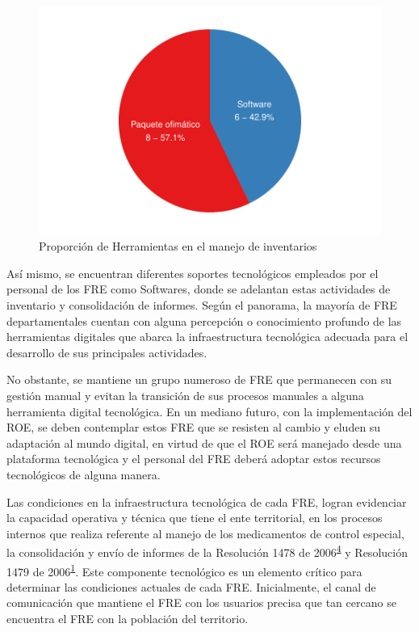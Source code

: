 \documentclass[
]{book}
\begin{document}
\begin{figure}
\includegraphics[width=0.85\linewidth]{InformeFinal_files/figure-latex/PropHerramientasManejoInventarios-1} \caption{Proporción de Herramientas en el manejo de inventarios}\label{fig:PropHerramientasManejoInventarios}
\end{figure}

Así mismo, se encuentran diferentes soportes tecnológicos empleados por el personal de los FRE como Softwares, donde se adelantan estas actividades de inventario y consolidación de informes. Según el panorama, la mayoría de FRE departamentales cuentan con alguna percepción o conocimiento profundo de las herramientas digitales que abarca la infraestructura tecnológica adecuada para el desarrollo de sus principales actividades.

No obstante, se mantiene un grupo numeroso de FRE que permanecen con su gestión manual y evitan la transición de sus procesos manuales a alguna herramienta digital tecnológica. En un mediano futuro, con la implementación del ROE, se deben contemplar estos FRE que se resisten al cambio y eluden su adaptación al mundo digital, en virtud de que el ROE será manejado desde una plataforma tecnológica y el personal del FRE deberá adoptar estos recursos tecnológicos de alguna manera.

Las condiciones en la infraestructura tecnológica de cada FRE, logran evidenciar la capacidad operativa y técnica que tiene el ente territorial, en los procesos internos que realiza referente al manejo de los medicamentos de control especial, la consolidación y envío de informes de la Resolución 1478 de 2006\textsuperscript{\protect\hyperlink{ref-MSPS1478-2006}{4}} y Resolución 1479 de 2006\textsuperscript{\protect\hyperlink{ref-MSPS1479-2006}{1}}. Este componente tecnológico es un elemento crítico para determinar las condiciones actuales de cada FRE. Inicialmente, el canal de comunicación que mantiene el FRE con los usuarios precisa que tan cercano se encuentra el FRE con la población del territorio.
\end{document}
